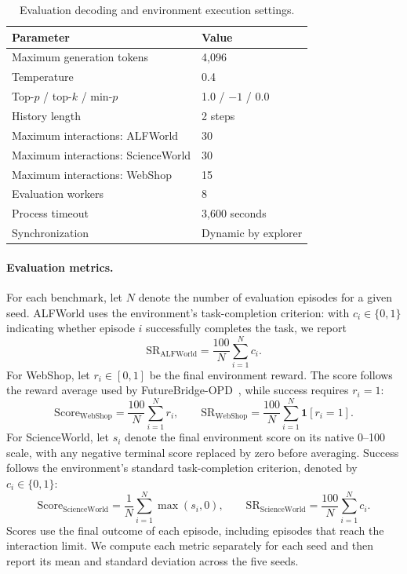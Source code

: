 \documentclass{article}
\begin{document}
\begin{table}[H]
\centering
\small
\caption{Evaluation decoding and environment execution settings.}
\label{tab:evaluation-config}
\begin{tabular}{ll}
\toprule
Parameter & Value \\
\midrule
Maximum generation tokens & 4,096 \\
Temperature & 0.4 \\
Top-$p$ / top-$k$ / min-$p$ & 1.0 / $-1$ / 0.0 \\
History length & 2 steps \\
Maximum interactions: ALFWorld & 30 \\
Maximum interactions: ScienceWorld & 30 \\
Maximum interactions: WebShop & 15 \\
Evaluation workers & 8 \\
Process timeout & 3,600 seconds \\
Synchronization & Dynamic by explorer \\
\bottomrule
\end{tabular}
\end{table}

\paragraph{Evaluation metrics.}
For each benchmark, let $N$ denote the number of evaluation episodes for a given seed.
ALFWorld uses the environment's task-completion criterion: with $c_i\in\{0,1\}$ indicating
whether episode $i$ successfully completes the task, we report
\begin{equation}
\mathrm{SR}_{\mathrm{ALFWorld}}=\frac{100}{N}\sum_{i=1}^{N}c_i.
\end{equation}
For WebShop, let $r_i\in[0,1]$ be the final environment reward. The score follows the
reward average used by FutureBridge-OPD~\citep{chen2026look}, while success requires
$r_i=1$:
\begin{equation}
\mathrm{Score}_{\mathrm{WebShop}}=\frac{100}{N}\sum_{i=1}^{N}r_i,
\qquad
\mathrm{SR}_{\mathrm{WebShop}}=\frac{100}{N}\sum_{i=1}^{N}\mathbf{1}[r_i=1].
\end{equation}
For ScienceWorld, let $s_i$ denote the final environment score on its native 0--100 scale,
with any negative terminal score replaced by zero before averaging. Success follows the
environment's standard task-completion criterion, denoted by $c_i\in\{0,1\}$:
\begin{equation}
\mathrm{Score}_{\mathrm{ScienceWorld}}=\frac{1}{N}\sum_{i=1}^{N}\max(s_i,0),
\qquad
\mathrm{SR}_{\mathrm{ScienceWorld}}=\frac{100}{N}\sum_{i=1}^{N}c_i.
\end{equation}
Scores use the final outcome of each episode, including episodes that reach the interaction
limit. We compute each metric separately for each seed and then report its mean and
standard deviation across the five seeds.
\end{document}
